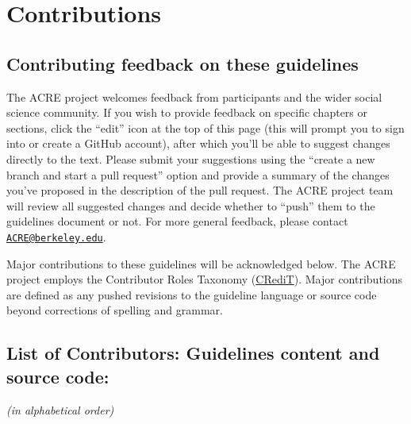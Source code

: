 \documentclass[]{book}
\begin{document}
\hypertarget{contributions}{%
\chapter{Contributions}\label{contributions}}

\hypertarget{contributing-feedback-on-these-guidelines}{%
\section{Contributing feedback on these guidelines}\label{contributing-feedback-on-these-guidelines}}

The ACRE project welcomes feedback from participants and the wider social science community. If you wish to provide feedback on specific chapters or sections, click the ``edit'' icon at the top of this page (this will prompt you to sign into or create a GitHub account), after which you'll be able to suggest changes directly to the text. Please submit your suggestions using the ``create a new branch and start a pull request'' option and provide a summary of the changes you've proposed in the description of the pull request. The ACRE project team will review all suggested changes and decide whether to ``push'' them to the guidelines document or not. For more general feedback, please contact \href{mailto:ACRE@berkeley.edu}{\nolinkurl{ACRE@berkeley.edu}}.

Major contributions to these guidelines will be acknowledged below. The ACRE project employs the Contributor Roles Taxonomy (\href{https://casrai.org/credit/}{CRediT}). Major contributions are defined as any pushed revisions to the guideline language or source code beyond corrections of spelling and grammar.

\hypertarget{list-of-contributors-guidelines-content-and-source-code}{%
\section{List of Contributors: Guidelines content and source code:}\label{list-of-contributors-guidelines-content-and-source-code}}

\emph{(in alphabetical order)}
\end{document}
